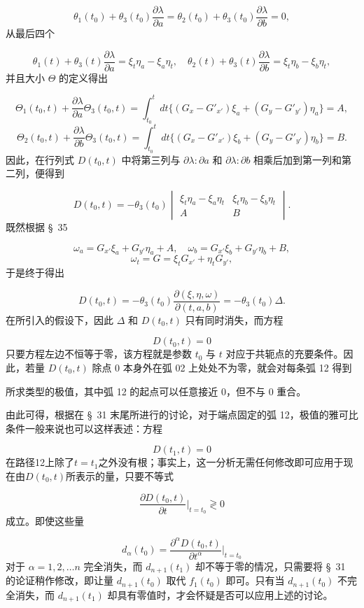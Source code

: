 \documentclass[11pt,a4paper,leqno]{article}
\begin{document}
\[
\theta_1(t_0)+\theta_3(t_0)\frac{\partial\lambda}{\partial a}=\theta_2(t_0)+\theta_3(t_0)\frac{\partial\lambda}{\partial b}=0,
\]
从最后四个

\[
\theta_1(t)+\theta_3(t)\frac{\partial\lambda}{\partial a}=\xi_t\eta_a-\xi_a\eta_t,
\quad
\theta_2(t)+\theta_3(t)\frac{\partial\lambda}{\partial b}=\xi_t\eta_b-\xi_b\eta_t,
\]
并且大小 $\Theta$ 的定义得出

\[
\Theta_1(t_0,t)+\frac{\partial\lambda}{\partial a}\Theta_3(t_0,t)=
\int_{t_0}^{t}dt\{(G_x-G'_{x'})\xi_a+(G_y-G'_{y'})\eta_a\}=A,
\]
\[
\Theta_2(t_0,t)+\frac{\partial\lambda}{\partial b}\Theta_3(t_0,t)=
\int_{t_0}^{t}dt\{(G_x-G'_{x'})\xi_b+(G_y-G'_{y'})\eta_b\}=B.
\]
因此，在行列式 $D(t_0,t)$ 中将第三列与 $\partial\lambda:\partial a$ 和 $\partial\lambda:\partial b$ 相乘后加到第一列和第二列，便得到

\[
D(t_0,t)=-\theta_3(t_0)\begin{vmatrix}
\xi_t\eta_a-\xi_a\eta_t&\xi_t\eta_b-\xi_b\eta_t\\
A&B
\end{vmatrix}.
\]
既然根据 \S~35

\[
\omega_a=G_{x'}\xi_a+G_{y'}\eta_a+A,
\quad
\omega_b=G_{x'}\xi_b+G_{y'}\eta_b+B,
\]
\[
\omega_t=G=\xi_tG_{x'}+\eta_tG_{y'},
\]
于是终于得出

\[
D(t_0,t)=-\theta_3(t_0)\frac{\partial(\xi,\eta,\omega)}{\partial(t,a,b)}=-\theta_3(t_0)\Delta.
\]
在所引入的假设下，因此 $\Delta$ 和 $D(t_0,t)$ 只有同时消失，而方程

\[
D(t_0,t)=0
\]
只要方程左边不恒等于零，该方程就是参数 $t_0$ 与 $t$ 对应于共轭点的充要条件。因此，若量 $D(t_0,t)$ 除点 0 本身外在弧 02 上处处不为零，就会对每条弧 12 得到

所求类型的极值，其中弧 12 的起点可以任意接近 0，但不与 0 重合。

由此可得，根据在 \S~31 末尾所进行的讨论，对于端点固定的弧 12，极值的雅可比条件一般来说也可以这样表述：方程

\[
D(t_1,t)=0
\]
在路径12上除了$t=t_1$之外没有根；事实上，这一分析无需任何修改即可应用于现在由$D(t_0,t)$所表示的量，只要不等式

\[
\frac{\partial D(t_0,t)}{\partial t}\bigg|_{t=t_0}\gtrless 0
\]
成立。即使这些量

\[
d_\alpha(t_0)=\frac{\partial^\alpha D(t_0,t)}{\partial t^\alpha}\bigg|_{t=t_0}
\]
对于 $\alpha=1,2,\ldots n$ 完全消失，而 $d_{n+1}(t_1)$ 却不等于零的情况，只需要将 \S~31 的论证稍作修改，即让量 $d_{n+1}(t_0)$ 取代 $f_1(t_0)$ 即可。只有当 $d_{n+1}(t_0)$ 不完全消失，而 $d_{n+1}(t_1)$ 却具有零值时，才会怀疑是否可以应用上述的讨论。
\end{document}
